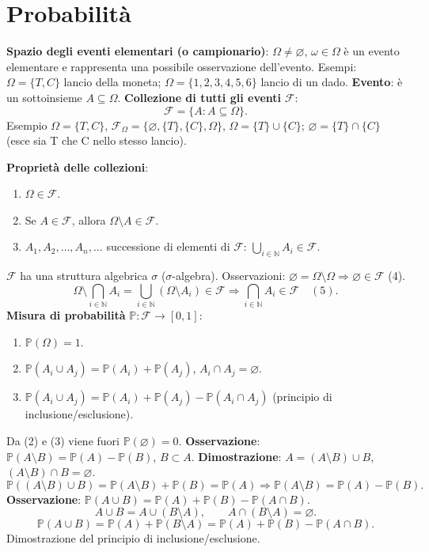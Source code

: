 \documentclass[11pt,a4paper]{article}
\newcommand{\pagina}[1]{\clearpage}
\begin{document}
\section*{Probabilità}
\textbf{Spazio degli eventi elementari (o campionario)}: $\Omega\ne\varnothing$, $\omega\in\Omega$ è un evento elementare e rappresenta una possibile osservazione dell'evento. Esempi: $\Omega=\{T,C\}$ lancio della moneta; $\Omega=\{1,2,3,4,5,6\}$ lancio di un dado.
\pagina{12}\textbf{Evento}: è un sottoinsieme $A\subseteq\Omega$.
\textbf{Collezione di tutti gli eventi} $\mathcal F$:
\[\mathcal F=\{A:A\subseteq\Omega\}.\]
Esempio $\Omega=\{T,C\}$, $\mathcal F_\Omega=\{\varnothing,\{T\},\{C\},\Omega\}$, $\Omega=\{T\}\cup\{C\}$; $\varnothing=\{T\}\cap\{C\}$ (esce sia T che C nello stesso lancio).

\textbf{Proprietà delle collezioni}:
\begin{enumerate}\item $\Omega\in\mathcal F$.
\item Se $A\in\mathcal F$, allora $\Omega\setminus A\in\mathcal F$.
\item $A_1,A_2,\ldots,A_n,\ldots$ successione di elementi di $\mathcal F$: $\bigcup_{i\in\mathbb N}A_i\in\mathcal F$.
\end{enumerate}
$\mathcal F$ ha una struttura algebrica $\sigma$ ($\sigma$-algebra).
Osservazioni: $\varnothing=\Omega\setminus\Omega\Rightarrow\varnothing\in\mathcal F$ (4).
\[\Omega\setminus\bigcap_{i\in\mathbb N}A_i=\bigcup_{i\in\mathbb N}(\Omega\setminus A_i)\in\mathcal F\Rightarrow\bigcap_{i\in\mathbb N}A_i\in\mathcal F\quad(5).\]
\textbf{Misura di probabilità} $\mathbb P:\mathcal F\to[0,1]$:
\begin{enumerate}\item $\mathbb P(\Omega)=1$.
\item $\mathbb P(A_i\cup A_j)=\mathbb P(A_i)+\mathbb P(A_j)$, $A_i\cap A_j=\varnothing$.
\item $\mathbb P(A_i\cup A_j)=\mathbb P(A_i)+\mathbb P(A_j)-\mathbb P(A_i\cap A_j)$ (principio di inclusione/esclusione).
\end{enumerate}
Da (2) e (3) viene fuori $\mathbb P(\varnothing)=0$.
\pagina{13}\textbf{Osservazione}: $\mathbb P(A\setminus B)=\mathbb P(A)-\mathbb P(B)$, $B\subset A$.
\textbf{Dimostrazione}: $A=(A\setminus B)\cup B$, $(A\setminus B)\cap B=\varnothing$.
\[\mathbb P((A\setminus B)\cup B)=\mathbb P(A\setminus B)+\mathbb P(B)=\mathbb P(A)\Rightarrow\mathbb P(A\setminus B)=\mathbb P(A)-\mathbb P(B).\]
\textbf{Osservazione}: $\mathbb P(A\cup B)=\mathbb P(A)+\mathbb P(B)-\mathbb P(A\cap B)$.
\[A\cup B=A\cup(B\setminus A),\qquad A\cap(B\setminus A)=\varnothing.\]
\[\mathbb P(A\cup B)=\mathbb P(A)+\mathbb P(B\setminus A)=\mathbb P(A)+\mathbb P(B)-\mathbb P(A\cap B).\]
Dimostrazione del principio di inclusione/esclusione.
\end{document}
